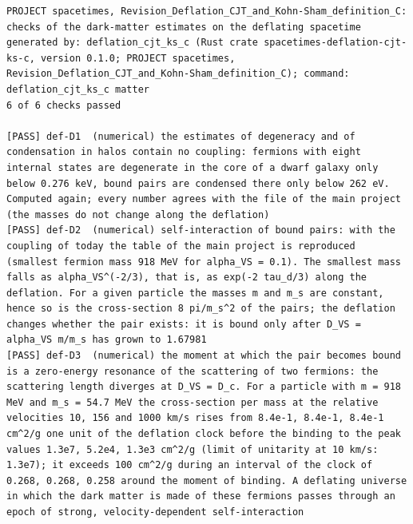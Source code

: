 \documentclass[
  10pt,
]{article}
\begin{document}
\begin{verbatim}
PROJECT spacetimes, Revision_Deflation_CJT_and_Kohn-Sham_definition_C: checks of the dark-matter estimates on the deflating spacetime
generated by: deflation_cjt_ks_c (Rust crate spacetimes-deflation-cjt-ks-c, version 0.1.0; PROJECT spacetimes, Revision_Deflation_CJT_and_Kohn-Sham_definition_C); command: deflation_cjt_ks_c matter
6 of 6 checks passed

[PASS] def-D1  (numerical) the estimates of degeneracy and of condensation in halos contain no coupling: fermions with eight internal states are degenerate in the core of a dwarf galaxy only below 0.276 keV, bound pairs are condensed there only below 262 eV. Computed again; every number agrees with the file of the main project (the masses do not change along the deflation)
[PASS] def-D2  (numerical) self-interaction of bound pairs: with the coupling of today the table of the main project is reproduced (smallest fermion mass 918 MeV for alpha_VS = 0.1). The smallest mass falls as alpha_VS^(-2/3), that is, as exp(-2 tau_d/3) along the deflation. For a given particle the masses m and m_s are constant, hence so is the cross-section 8 pi/m_s^2 of the pairs; the deflation changes whether the pair exists: it is bound only after D_VS = alpha_VS m/m_s has grown to 1.67981
[PASS] def-D3  (numerical) the moment at which the pair becomes bound is a zero-energy resonance of the scattering of two fermions: the scattering length diverges at D_VS = D_c. For a particle with m = 918 MeV and m_s = 54.7 MeV the cross-section per mass at the relative velocities 10, 156 and 1000 km/s rises from 8.4e-1, 8.4e-1, 8.4e-1 cm^2/g one unit of the deflation clock before the binding to the peak values 1.3e7, 5.2e4, 1.3e3 cm^2/g (limit of unitarity at 10 km/s: 1.3e7); it exceeds 100 cm^2/g during an interval of the clock of 0.268, 0.268, 0.258 around the moment of binding. A deflating universe in which the dark matter is made of these fermions passes through an epoch of strong, velocity-dependent self-interaction

\end{verbatim}
\end{document}
